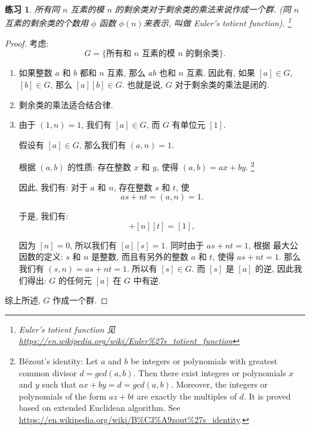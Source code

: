 \documentclass[utf8]{ctexbook}
\newtheorem{exercise}{练习}[section]
\begin{document}
\begin{exercise}\label{memo_euler_toient_function}
所有同 $n$ 互素的模 $n$ 的剩余类对于剩余类的乘法来说作成一个群. (同 $n$ 互素的剩余类的个数用 $\phi$ 函数 $ \phi (n) $来表示, 叫做 Euler's totient function). \footnote{Euler's totient function 见 \url{https://en.wikipedia.org/wiki/Euler\%27s\_totient\_function}}
\end{exercise}

\begin{proof}
考虑:
\begin{equation}
G = \{ \mbox{所有和 $n$ 互素的模 $n$ 的剩余类} \} .
\end{equation}

\begin{enumerate}
\item{如果整数 $a$ 和 $b$ 都和 $n$ 互素, 那么 $ab$ 也和 $n$ 互素. 因此有, 如果 $[a] \in G$, $[b] \in G$, 那么 $[a][b] \in G$. 也就是说, $G$ 对于剩余类的乘法是闭的.}
\item{剩余类的乘法适合结合律.}
\item{由于 $(1, n ) = 1$, 我们有 $[a] \in G$, 而 $G$ 有单位元 $[1]$.

假设有 $[a] \in G$, 那么我们有 $(a, n) = 1$. 

根据 $(a,b)$ 的性质: 存在整数 $x$ 和 $y$, 使得 $(a, b) = ax + by$. \footnote{\label{footnote_bezout_identity} Bézout's identity: Let $a$ and $b$ be integers or polynomials with greatest common divisor $d= gcd(a,b)$. Then there exist integers or polynomials $x$ and $y$ such that $ax + by = d = gcd(a,b)$. Moreover, the integers or polynomials of the form $az + bt$ are exactly the multiples of $d$. It is proved based on extended Euclidean algorithm. See \url{https://en.wikipedia.org/wiki/B\%C3\%A9zout\%27s\_identity}.}

因此, 我们有: 对于 $a$ 和 $n$, 存在整数 $s$ 和 $t$, 使
\begin{equation}
as + nt = (a, n) = 1 .
\end{equation}

于是, 我们有:
\begin{equation}
[a] [s] + [n][t] = [1] ,
\end{equation}

因为 $[n]=0$, 所以我们有 $[a][s] = 1$. 同时由于 $as + nt = 1 $, 根据 最大公因数的定义: $s$ 和 $n$ 是整数, 而且有另外的整数 $a$ 和 $t$, 使得 $as + nt = 1$. 那么我们有 $(s, n) = as + nt = 1$. 所以有 $[s] \in G$. 而 $[s]$ 是 $[a]$ 的逆, 因此我们得出: $G$ 的任何元 $[a]$ 在 $G$ 中有逆.
}
\end{enumerate}

综上所述, $G$ 作成一个群.
\end{proof}
\end{document}
